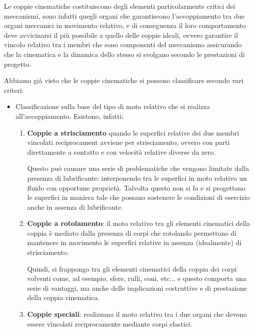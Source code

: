 Le coppie cinematiche costituiscono degli elementi particolarmente critici dei meccanismi, sono infatti quegli organi che garantiscono l'accoppiamento tra due organi meccanici in movimento relativo, e di conseguenza il loro comportamento deve avvicinarsi il più possibile a quello delle coppie ideali, ovvero garantire il vincolo relativo tra i membri che sono componenti del meccanismo assicurando che la cinematica e la dinamica dello stesso si svolgano secondo le prestazioni di progetto.

Abbiamo già visto che le coppie cinematiche si possono classificare secondo vari criteri:
\begin{itemize}
\item Classificazione sulla base del tipo di moto relativo che si realizza all'accoppiamento. Esistono, infatti:
\begin{enumerate}
\item \textbf{Coppie a strisciamento} quando le superfici relative dei due membri vincolati reciprocament avviene per strisciamento, ovvero con parti direttamente a contatto e con velocità relative diverse da zero.

Questo può causare una serie di problematiche che vengono limitate dalla presenza di lubrificante: interponendo tra le superfici in moto relativo un fluido con opportune proprietà. Talvolta questo non si fa e si progettano le superfici in maniera tale che possano sostenere le condizioni di esercizio anche in assenza di lubrificante.
\item \textbf{Coppie a rotolamento}: il moto relativo tra gli elementi cinematici della coppia è mediato dalla presenza di corpi che rotolando permettono di mantenere in movimento le superfici relative in assenza (idealmente) di strisciamento.

Quindi, si frappongo tra gli elementi cinematici della coppia dei corpi volventi come, ad esempio, sfere, rulli, coni, etc... e questo comporta una serie di vantaggi, ma anche delle implicazioni costruttive e di prestazione della coppia cinematica.
\item \textbf{Coppie speciali}: realizzano il moto relativo tra i due organi che devono essere vincolati reciprocamente mediante corpi elastici.


\end{enumerate}
\end{itemize}
